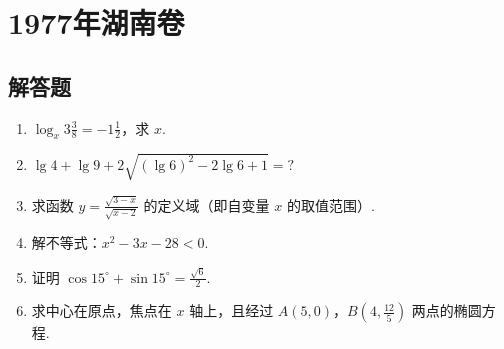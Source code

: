 \chapter{1977年湖南卷}

\section{解答题}

\begin{problem}
\begin{enumerate}
    \item \( \log_x 3\frac{3}{8}=-1\frac{1}{2} \)，求 \( x \).
    \item \(\lg 4+\lg 9+2\sqrt{\left(\lg 6\right)^2-2\lg 6+1}=?\)
    \item 求函数 \( y=\frac{\sqrt{3-x}}{\sqrt{x-2}} \) 的定义域（即自变量 \( x \) 的取值范围）.
    \item 解不等式：\(x^2-3x-28<0\).
    \item 证明 \(\cos 15^\circ+\sin 15^\circ=\frac{\sqrt{6}}{2}\).
    \item 求中心在原点，焦点在 \(x\) 轴上，且经过 \(A\left(5,0\right)\)，\(B\left(4,\frac{12}{5}\right)\) 两点的椭圆方程.
\end{enumerate}
\end{problem}

